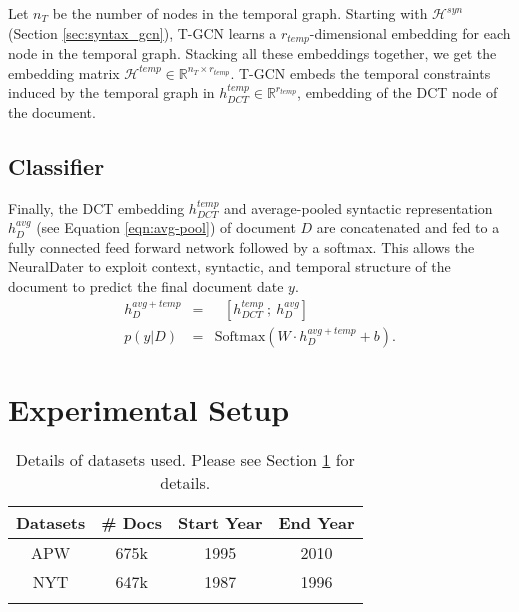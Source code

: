 \documentclass[11pt,a4paper]{article}
\newcommand{\refeqn}[1]{Equation \ref{#1}}
\newcommand{\refsec}[1]{Section \ref{#1}}
\newcommand{\m}[1]{\mathcal{#1}}
\newcommand{\method}{NeuralDater}
\begin{document}
Let $n_T$ be the number of nodes in the temporal graph. Starting with $\m{H}^{syn}$ (\refsec{sec:syntax_gcn}), T-GCN learns a $r_{temp}$-dimensional embedding for each node in the temporal graph. Stacking all these embeddings together, we get the embedding matrix $\m{H}^{temp} \in \mathbb{R}^{n_{T} \times r_{temp}}$. T-GCN embeds the temporal constraints induced by the temporal graph in $h_{DCT}^{temp} \in \mathbb{R}^{r_{temp}}$, embedding of the DCT node of the document. 




\subsection{Classifier}
Finally, the DCT embedding $h_{DCT}^{temp}$ and average-pooled syntactic representation $h_{D}^{avg}$ (see \refeqn{eqn:avg-pool}) of document $D$ are concatenated and fed to a fully connected feed forward network followed by a softmax. This allows the \method{} to exploit context, syntactic, and temporal structure of the document to  predict the final document date $y$.
\begin{eqnarray*}
	h_{D}^{avg+temp} &=& \text{ } [h_{DCT}^{temp}~;~h_{D}^{avg}] \\ 
	p(y \vert D) &=& \mathrm{Softmax}(W \cdot h_{D}^{avg+temp} + b).
\end{eqnarray*}




















 \section{Experimental Setup}
\label{sec:experiments}

\begin{table}[t]
	\begin{tabular}{cccc}
		\toprule
		Datasets 	& \# Docs & Start Year & End Year\\
		\midrule
		APW 		&  675k	& 1995  & 2010 \\
		NYT			&  647k	& 1987  & 1996 \\
		\bottomrule
		\addlinespace
	\end{tabular}
	\caption{\label{tb:datasets}Details of datasets used. Please see \refsec{sec:experiments} for details.}
\end{table}
\end{document}
